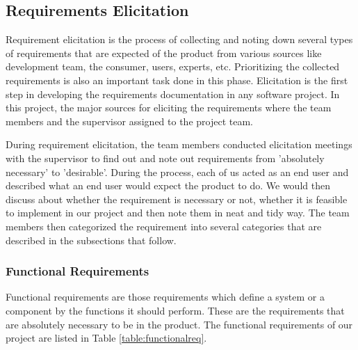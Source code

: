 \documentclass[12pt, a4paper, oneside]{article}
\begin{document}
\subsection{Requirements Elicitation}
Requirement elicitation is the process of collecting and noting down several types of requirements that are expected of the product from various sources like development team, the consumer, users, experts, etc. Prioritizing the collected requirements is also an important task done in this phase. Elicitation is the first step in developing the requirements documentation in any software project. In this project, the major sources for eliciting the requirements where the team members and the supervisor assigned to the project team.

During requirement elicitation, the team members conducted elicitation meetings with the supervisor to find out and note out requirements from 'absolutely necessary' to 'desirable'. During the process, each of us acted as an end user and described what an end user would expect the product to do. We would then discuss about whether the requirement is necessary or not, whether it is feasible to implement in our project and then note them in neat and tidy way. The team members then categorized the requirement into several categories that are described in the subsections that follow.

\subsubsection{Functional Requirements}
Functional requirements are those requirements which define a system or a component by the functions it should perform. These are the requirements that are absolutely necessary to be in the product. The functional requirements of our project are listed in Table \ref{table:functionalreq}.
\end{document}
